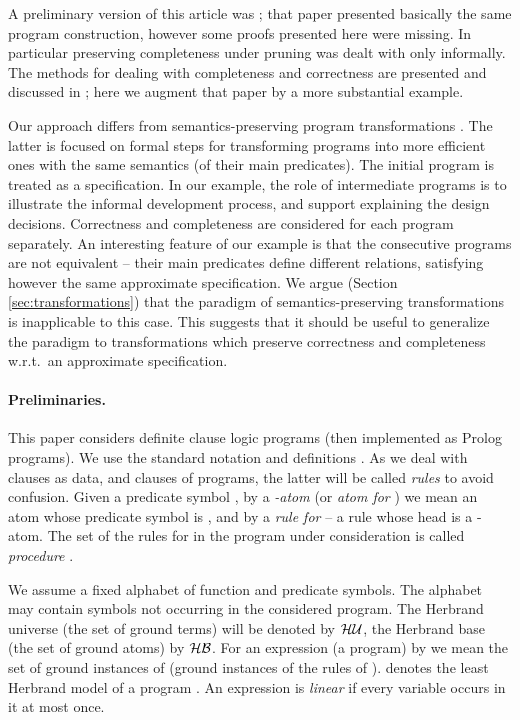 \documentclass{tlp}
\newcommand*{\HU}{{\ensuremath{\cal{H U}}}\xspace}
\newcommand*{\HB}{{\ensuremath{\cal{H B}}}\xspace}
\begin{document}
A preliminary version of this article was \cite{drabent12.iclp};
that paper presented basically the same program construction, however 
some proofs presented here were missing.  In particular preserving
completeness under pruning was dealt with only informally.
The methods for dealing with completeness and correctness are presented and
discussed in \cite{drabent.tocl16}; 
here we augment that paper by a more substantial example.






Our approach differs from semantics-preserving program transformations 
 \cite[and the references therein]{PettorossiPS10shorter}.
The latter is focused on formal steps for transforming programs into more
efficient ones with the same semantics (of their main predicates).
The initial program is treated as a specification.
In our example, the role of intermediate programs is to illustrate the
informal development process, and support explaining the design decisions.
Correctness and completeness are considered for each program separately.
An interesting feature of our example is that the consecutive programs
are not equivalent -- their main predicates define different
relations, satisfying however the same approximate specification.
We argue
(Section \ref{sec:transformations})
that the paradigm of semantics-preserving transformations is inapplicable
to this case.
This suggests that it should be useful to generalize the paradigm 
to transformations which preserve
correctness and completeness w.r.t.\ an approximate specification.




\paragraph{Preliminaries.}
This paper considers definite clause logic programs
(then implemented as Prolog programs).
We use the standard notation and definitions \cite{Apt-Prolog}.
As we deal with clauses as data, and clauses of programs, the latter will be
called {\em rules} to avoid confusion.
Given a predicate symbol , by a {\em -atom} (or {\em atom for} )
 we mean an atom whose
predicate symbol is , and by a {\em rule for}  -- a rule whose head
is a -atom.
The set of the rules for  in the program under consideration is called
{\em procedure} .








We assume a fixed alphabet of function and predicate symbols.
The alphabet may contain symbols not occurring in the considered program.
The Herbrand universe (the set of ground terms) will be denoted by \HU, the
Herbrand base (the set of ground atoms) by \HB. 
For an expression (a program) 
by  we mean the set of ground instances
of  (ground instances of the rules of ).
 denotes the least Herbrand model of a program .
An expression is {\em linear} if every variable occurs in it at most once.
\end{document}
